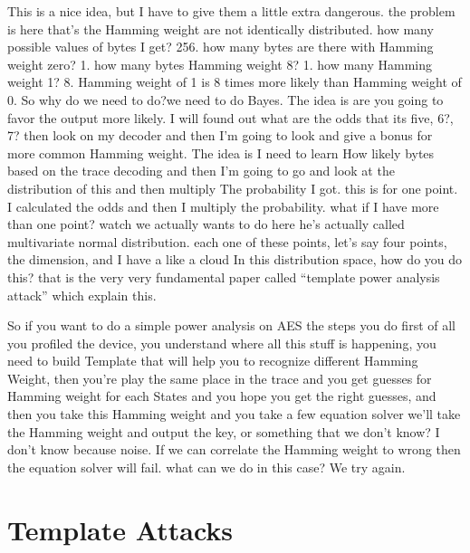 This is a nice idea, but I have to give them a little extra dangerous. the problem is here that's the Hamming weight are not identically distributed. how many possible values of bytes I get? 256. how many bytes are there with Hamming weight zero? 1. how many bytes Hamming weight 8? 1. how many Hamming weight 1? 8. Hamming weight of 1 is 8 times more likely than Hamming weight of 0. So why do we need to do?we need to do Bayes. The idea is are you going to favor the output more likely. I will found out what are the odds that its five, 6?, 7? then look on my decoder and then I'm going to look and give a bonus for more common Hamming weight. The idea is I need to learn How likely bytes based on the trace decoding and then I'm going to go and look at the distribution of this and then multiply The probability I got. this is for one point. I calculated the odds and then I multiply the probability. what if I have more than one point? watch we actually wants to do here he's actually called multivariate normal distribution. each one of these points, let's say four points, the dimension, and I have a like a cloud In this distribution space, how do you do this? that is the very very fundamental paper called “template power analysis attack” which explain this.

So if you want to do a simple power analysis on AES the steps you do first of all you profiled the device, you understand where all this stuff is happening, you need to build Template that will help you to recognize different Hamming Weight, then you're play the same place in the trace and you get guesses for Hamming weight for each States and you hope you get the right guesses, and then you take this Hamming weight and you take a few equation solver we'll take the Hamming weight and output the key, or something that we don't know? I don't know because noise. If we can correlate the Hamming weight to wrong then the equation solver will fail. what can we do in this case? We try again.

\newpage
\section{Template Attacks} 
